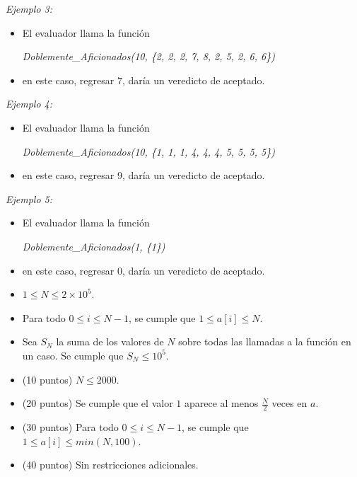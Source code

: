 \documentclass[12pt]{scrartcl}
\begin{document}
        {\itshape Ejemplo 3:}
        \begin{itemize}
            \item El evaluador llama la función 
            
            \begin{center}
                {\itshape Doblemente\_Aficionados(10, \{2, 2, 2, 7, 8, 2, 5, 2, 6, 6\})}
            \end{center}

            \item en este caso, regresar $7$, daría un veredicto de aceptado.
        \end{itemize}

        {\itshape Ejemplo 4:}
        \begin{itemize}
            \item El evaluador llama la función 

            \begin{center}
                {\itshape Doblemente\_Aficionados(10, \{1, 1, 1, 4, 4, 4, 5, 5, 5, 5\})}
            \end{center}

            \item en este caso, regresar $9$, daría un veredicto de aceptado.
        \end{itemize}
        
        {\itshape Ejemplo 5:}
        \begin{itemize}
            \item El evaluador llama la función 

            \begin{center}
                {\itshape Doblemente\_Aficionados(1, \{1\})}
            \end{center}

            \item en este caso, regresar $0$, daría un veredicto de aceptado.
        \end{itemize}
        
        \begin{itemize}
            \item $1 \le N \le 2 \times 10^5$.
            \item Para todo $0 \le i \le N - 1$, se cumple que $1 \le a[i] \le N$.
            \item Sea $S_N$ la suma de los valores de $N$ sobre todas las llamadas a la función en un caso. Se cumple que $S_N \le 10^5$.
        \end{itemize}
    


    \begin{itemize}
        \item (10 puntos) $N \le 2000$.
        \item (20 puntos) Se cumple que el valor $1$ aparece al menos $\frac{N}{2}$ veces en $a$.
        \item (30 puntos) Para todo $0 \le i \le N - 1$, se cumple que $1 \le a[i] \le min(N, 100)$.
        \item (40 puntos) Sin restricciones adicionales.
    \end{itemize}
\end{document}
